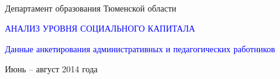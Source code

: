\begin{frame}

\centering

\small{ \fullName\\  \vspace{.3cm}
Департамент образования Тюменской области  } \\ \vspace{2cm}

\large{\textcolor{blue}{АНАЛИЗ УРОВНЯ СОЦИАЛЬНОГО КАПИТАЛА}} \\ \vspace{.5cm}

\textcolor{blue}{Данные анкетирования административных и педагогических работников} \\ \vspace{2.5cm}

\small
Июнь -- август 2014 года

\end{frame}


